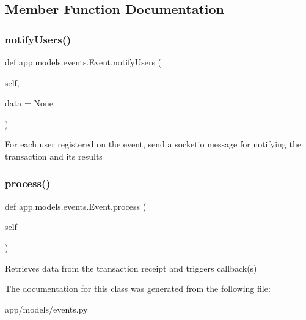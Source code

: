 \subsection{Member Function Documentation}
\mbox{\label{classapp_1_1models_1_1events_1_1_event_a161c2351b3dad94eee41f1a6d467f895}} 
\subsubsection{\texorpdfstring{notify\+Users()}{notifyUsers()}}
{\footnotesize\ttfamily def app.\+models.\+events.\+Event.\+notify\+Users (\begin{DoxyParamCaption}\item[{}]{self,  }\item[{}]{data = {\ttfamily None} }\end{DoxyParamCaption})}

\begin{DoxyVerb}For each user registered on the event, send a socketio message for notifying the transaction and its results
\end{DoxyVerb}
 \mbox{\label{classapp_1_1models_1_1events_1_1_event_adc489dd02d1fe4e287d5c369a9f3a443}} 
\subsubsection{\texorpdfstring{process()}{process()}}
{\footnotesize\ttfamily def app.\+models.\+events.\+Event.\+process (\begin{DoxyParamCaption}\item[{}]{self }\end{DoxyParamCaption})}

\begin{DoxyVerb}Retrieves data from the transaction receipt and triggers callback(s)
\end{DoxyVerb}
 

The documentation for this class was generated from the following file\+:\begin{DoxyCompactItemize}
\item 
app/models/events.\+py\end{DoxyCompactItemize}
